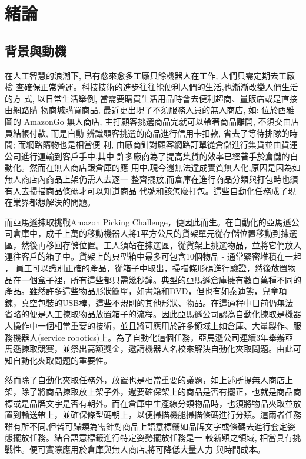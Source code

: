 \chapter{緒論}
\label{chapter:intro}

\section{背景與動機}

在人工智慧的浪潮下, 已有愈來愈多工廠只餘機器人在工作, 人們只需定期去工廠檢
查確保正常營運。科技技術的進步往往能便利人們的生活,也漸漸改變人們生活的方
式, 以日常生活舉例, 當需要購買生活用品時會去便利超商、量販店或是直接由網路購
物商城購買商品, 最近更出現了不須服務人員的無人商店, 如: 位於西雅圖的 AmazonGo
無人商店, 主打顧客挑選商品完就可以帶著商品離開, 不須交由店員結帳付款, 而是自動
辨識顧客挑選的商品進行信用卡扣款, 省去了等待排隊的時間; 而網路購物也是相當便
利, 由廠商針對顧客網路訂單從倉儲進行集貨並由貨運公司進行運輸到客戶手中,其中
許多廠商為了提高集貨的效率已經著手於倉儲的自動化。然而在無人商店跟倉庫的應
用中,現今還無法達成實質無人化,原因是因為如無人商店內商品上架仍需人去逐一
整齊擺放,而倉庫在進行商品分類與打包時也須有人去掃描商品條碼才可以知道商品
代號和該怎麼打包。這些自動化任務成了現在業界都想解決的問題。


而亞馬遜揀取挑戰Amazon Picking Challenge，便因此而生。在自動化的亞馬遜公司倉庫中，成千上萬的移動機器人將1平方公尺的貨架單元從存儲位置移動到揀選區，然後再移回存儲位置。工人須站在揀選區，從貨架上挑選物品，並將它們放入運往客戶的箱子中。貨架上的典型箱中最多可包含10個物品 - 通常緊密堆積在一起 ， 員工可以識別正確的產品，從箱子中取出，掃描條形碼進行驗證，然後放置物品在一個盒子裡，所有這些都只需幾秒鐘。典型的亞馬遜倉庫擁有數百萬種不同的產品。雖然許多這些物品形狀簡單，如書籍和DVD，但也有如泰迪熊，兒童項鍊，真空包裝的USB棒，這些不規則的其他形狀、物品。在這過程中目前仍無法省略的便是人工揀取物品放置箱子的流程。因此亞馬遜公司認為自動化揀取是機器人操作中一個相當重要的技術，並且將可應用於許多領域上如倉庫、大量製作、服務機器人(service robotics)上。為了自動化這個任務，亞馬遜公司連續3年舉辦亞馬遜揀取競賽，並祭出高額獎金，邀請機器人名校來解決自動化夾取問題。由此可知自動化夾取問題的重要性。


然而除了自動化夾取任務外，放置也是相當重要的議題，如上述所提無人商店上架，除了將商品揀取放上架子外，還要確保架上的商品是否有擺正，也就是商品商標或是品牌文字是否有朝外。而在倉庫中生產線分類物品時，也須將物品夾取並放置到輸送帶上，並確保條型碼朝上，以便掃描機能掃描條碼進行分類。這兩者任務雖有所不同,但皆可歸類為需針對商品上語意標籤如品牌文字或條碼去進行套定姿態擺放任務。結合語意標籤進行特定姿勢擺放任務是一
較新穎之領域, 相當具有挑戰性。便可實際應用於倉庫與無人商店,將可降低大量人力
與時間成本。


